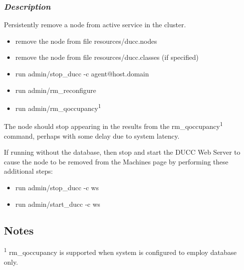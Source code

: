     \subsubsection{{\em Description}}
    Persistently remove a node from active service in the cluster.
    \begin{itemize}
      \item remove the node from file resources/ducc.nodes
      \item remove the node from file resources/ducc.classes (if specified)
      \item run admin/stop\_ducc -c agent@host.domain
      \item run admin/rm\_reconfigure
      \item run admin/rm\_qoccupancy\textsuperscript{1}
    \end{itemize}

	The node should stop appearing in the results from the
	rm\_qoccupancy\textsuperscript{1} command, perhaps with
	some delay due to system latency.
	
	If running without the database, then stop and start the DUCC
	Web Server 	to cause the node to be removed from the Machines
	page by performing these additional steps:
	
	 \begin{itemize}
      \item run admin/stop\_ducc -c ws
      \item run admin/start\_ducc -c ws
    \end{itemize}
	
\subsection{Notes}
\label{subsec:admin.notes}

	\textsuperscript{1} rm\_qoccupancy is supported when system is configured
	to employ database only.